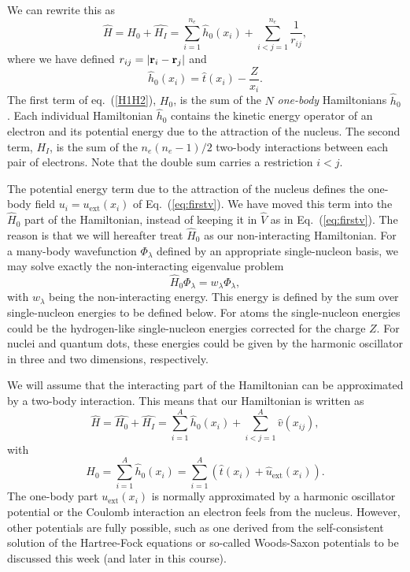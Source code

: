  We can rewrite this as
\begin{equation}
    \hat{H} = \hat{H_0} + \hat{H_I} = \sum_{i=1}^{n_e}\hat{h}_0(x_i) +
    \sum_{i<j=1}^{n_e}\frac{1}{r_{ij}},
\label{H1H2}
\end{equation}
where we have defined $r_{ij}=| {\bf r}_i-{\bf r}_j|$ and
\begin{equation}
  \hat{h}_0(x_i) = \hat{t}(x_i) - \frac{Z}{x_i}.
\label{hi}
\end{equation}
The first term of eq.~(\ref{H1H2}), $H_0$, is the sum of the $N$
\emph{one-body} Hamiltonians $\hat{h}_0$. Each individual Hamiltonian
$\hat{h}_0$ contains the kinetic energy operator of an electron and
its potential energy due to the attraction of the nucleus. The second
term, $H_I$, is the sum of the $n_e(n_e-1)/2$ two-body interactions
between each pair of electrons. Note that the double sum carries a
restriction $i<j$.

The potential energy term due to the attraction of the nucleus defines
the one-body field $u_i=u_{\mathrm{ext}}(x_i)$ of
Eq.~(\ref{eq:firstv}).  We have moved this term into the $\hat{H}_0$
part of the Hamiltonian, instead of keeping it in $\hat{V}$ as in
Eq.~(\ref{eq:firstv}).  The reason is that we will hereafter treat
$\hat{H}_0$ as our non-interacting Hamiltonian. For a many-body
wavefunction $\Phi_{\lambda}$ defined by an appropriate single-nucleon
basis, we may solve exactly the non-interacting eigenvalue problem
\[
\hat{H}_0\Phi_{\lambda}= w_{\lambda}\Phi_{\lambda},
\]
with $w_{\lambda}$ being the non-interacting energy. This energy is
defined by the sum over single-nucleon energies to be defined below.
For atoms the single-nucleon energies could be the hydrogen-like
single-nucleon energies corrected for the charge $Z$. For nuclei and
quantum dots, these energies could be given by the harmonic oscillator
in three and two dimensions, respectively.

We will assume that the interacting part of the Hamiltonian can be
approximated by a two-body interaction.  This means that our
Hamiltonian is written as
\begin{equation}
    \hat{H} = \hat{H_0} + \hat{H_I} = \sum_{i=1}^A \hat{h}_0(x_i) +
    \sum_{i<j=1}^A \hat{v}(x_{ij}),
\label{Hnuclei}
\end{equation}
with
\begin{equation}
  H_0=\sum_{i=1}^A \hat{h}_0(x_i) = \sum_{i=1}^A\left(\hat{t}(x_i) +
  \hat{u}_{\mathrm{ext}}(x_i)\right).
\label{hinuclei}
\end{equation}
The one-body part $u_{\mathrm{ext}}(x_i)$ is normally approximated by
a harmonic oscillator potential or the Coulomb interaction an electron
feels from the nucleus. However, other potentials are fully possible,
such as one derived from the self-consistent solution of the
Hartree-Fock equations or so-called Woods-Saxon potentials to be
discussed this week (and later in this course).

